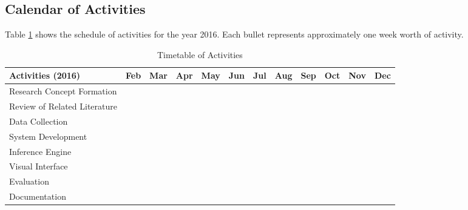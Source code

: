 \newpage

\begin{landscape}
\section{Calendar of Activities}

Table \ref{tab:timetableactivities} shows the schedule of activities for the year 2016.  
Each bullet represents approximately one week worth of activity.

%
%
\newcommand{\weekone}{\textbullet}
\newcommand{\weektwo}{\textbullet \textbullet}
\newcommand{\weekthree}{\textbullet \textbullet \textbullet}
\newcommand{\weekfour}{\textbullet \textbullet \textbullet \textbullet}

%
%
\begin{comment}
   \newcommand{\weekone}{$\star$}
   \newcommand{\weektwo}{$\star \star$}
   \newcommand{\weekthree}{$\star \star \star$}
   \newcommand{\weekfour}{$\star \star \star \star$ }
\end{comment}

\begin{table}[ht]   %
\centering
\caption{Timetable of Activities} \vspace{0.25em}
\begin{tabular}{|p{2in}|c|c|c|c|c|c|c|c|c|c|c|} \hline
\centering Activities (2016) & Feb  & Mar  & Apr  & May  & Jun  & Jul  & Aug  & Sep  & Oct  & Nov  &Dec\\ \hline
Research Concept Formation & ~~\weekthree  & \weekfour  &  &  &  &  &  &  &  &  & \\ \hline
Review of Related Literature &  & ~~\weekthree  & \weekfour  & \weekfour  & \weekfour  &  &  &  &  &  &  \\ \hline
Data Collection &  &  & ~~~\weektwo  & \weekfour  & \weekfour  & \weekfour  & \weektwo~~~  &  &  &  &  \\ \hline
System Development &  &  &  &  &  &  &  &  &  &  &  \\ \hline
Inference Engine &  &  &  &~~~\weektwo  & \weekfour  & \weekfour  & \weekfour  & \weekfour  &  &  & \\ \hline
Visual Interface &  &  &  &  & ~~~\weektwo  & \weekfour  &  \weekfour  &  \weekfour  &  \weekfour  &  &  \\ \hline
Evaluation &  &  &  &  &  &  & ~~~\weektwo  & \weekfour  & \weekfour  &  &  \\ \hline
Documentation & ~~\weekthree  & \weekfour  & \weekfour  & \weekfour  & \weekfour  & \weekfour  & \weekfour  & \weekfour  & \weekfour  & \weekfour  & \weektwo~~~  \\ \hline
\end{tabular}
\label{tab:timetableactivities}
\end{table}

\end{landscape}